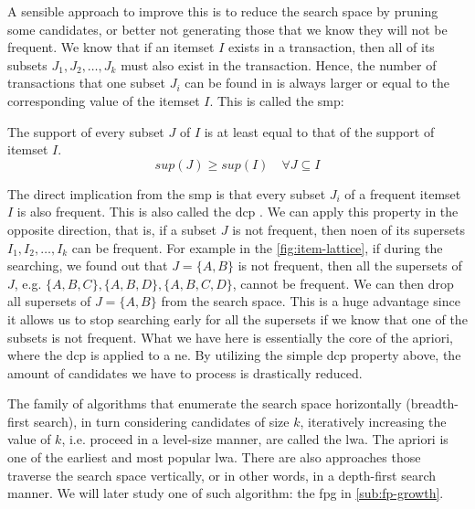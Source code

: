 A sensible approach to improve this is to reduce the search space by pruning some candidates, or better not generating those that we know they will not be frequent.
We know that if an itemset $I$ exists in a transaction, then all of its subsets $J_1, J_2, \dots, J_k$ must also exist in the transaction.
Hence, the number of transactions that one subset $J_i$ can be found in is always larger or equal to the corresponding value of the itemset $I$. This is called the \acl{smp}:
\begin{definition}
    The support of every subset $J$ of $I$ is at least equal to that of the support of itemset $I$.
    \begin{equation}
        sup(J) \geq sup(I) \quad \forall J \subseteq I
    \end{equation}
\end{definition}

The direct implication from the \acl{smp} is that every subset $J_i$ of a frequent itemset $I$ is also frequent.
This is also called the \acl{dcp} \citep{Aggarwal15}.
We can apply this property in the opposite direction, that is, if a subset $J$ is not frequent, then noen of its supersets $I_1, I_2, \dots, I_k$ can be frequent.
For example in the \autoref{fig:item-lattice}, if during the searching, we found out that $J = \{A, B\}$ is not frequent, then all the supersets of $J$, e.g. $\{A, B, C\}, \{A, B , D\}, \{A, B , C, D\}$, cannot be frequent.
We can then drop all supersets of ${J = \{A, B\}}$ from the search space.
This is a huge advantage since it allows us to stop searching early for all the supersets if we know that one of the subsets is not frequent.
What we have here is essentially the core of the \acl{apriori}, where the \acl{dcp} is applied to a \ac{ne}.
By utilizing the simple \acl{dcp} property above, the amount of candidates we have to process is drastically reduced.


The family of algorithms that enumerate the search space horizontally (breadth-first search), in turn considering candidates of size $k$, iteratively increasing the value of $k$, i.e. proceed in a level-size manner, are called the \acl{lwa}.
The \acl{apriori} is one of the earliest and most popular \acl{lwa}.
There are also approaches those traverse the search space vertically, or in other words, in a depth-first search manner.
We will later study one of such algorithm: the \acl{fpg} in \autoref{sub:fp-growth}.


